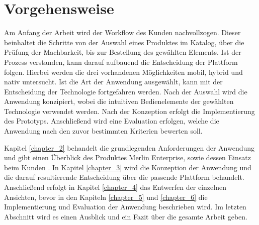 \section{Vorgehensweise}
Am Anfang der Arbeit wird der Workflow des Kunden nachvollzogen. Dieser beinhaltet die Schritte von der Auswahl eines Produktes im Katalog, über die Prüfung der Machbarkeit, bis zur Bestellung des gewählten Elements. Ist der Prozess verstanden, kann darauf aufbauend die Entscheidung der Plattform folgen. Hierbei werden die drei vorhandenen Möglichkeiten mobil, hybrid und nativ untersucht. Ist die Art der Anwendung ausgewählt, kann mit der Entscheidung der Technologie fortgefahren werden. Nach der Auswahl wird die Anwendung konzipiert, wobei die intuitiven Bedienelemente der gewählten Technologie verwendet werden. Nach der Konzeption erfolgt die Implementierung des Prototyps. Anschließend wird eine Evaluation erfolgen, welche die Anwendung nach den zuvor bestimmten Kriterien bewerten soll.

\par
Kapitel \ref{chapter_2} behandelt die grundlegenden Anforderungen der Anwendung und gibt einen Überblick des Produktes Merlin Enterprise, sowie dessen Einsatz beim Kunden . In Kapitel \ref{chapter_3} wird die Konzeption der Anwendung und die darauf resultierende Entscheidung über die passende Plattform behandelt. Anschließend erfolgt in Kapitel \ref{chapter_4} das Entwerfen der einzelnen Ansichten, bevor in den Kapiteln \ref{chapter_5} und \ref{chapter_6} die Implementierung und Evaluation der Anwendung beschrieben wird. Im letzten Abschnitt wird es einen Ausblick und ein Fazit über die gesamte Arbeit geben.







